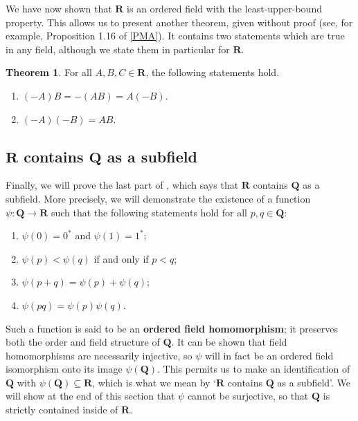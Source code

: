 \documentclass[12pt]{article}
\newcommand{\Q}{\mathbf{Q}}
\newcommand{\R}{\mathbf{R}}
\theoremstyle{definition}
\newtheorem{theorem}{Theorem}
\begin{document}
We have now shown that \( \R \) is an ordered field with the least-upper-bound property. This allows us to present another theorem, given without proof (see, for example, Proposition 1.16 of \hyperlink{pma}{[PMA]}). It contains two statements which are true in any field, although we state them in particular for \( \R \).

\begin{theorem}
\label{thm:multiplication_axioms}
    For all \( A, B, C \in \R \), the following statements hold.
    \begin{enumerate}[label = (\alph*)]
        \item \( (-A)B = -(AB) = A(-B) \).

        \item \( (-A)(-B) = AB \).
    \end{enumerate}
\end{theorem}

\subsection{\texorpdfstring{\(\R\)}{} contains \texorpdfstring{\(\Q\)}{} as a subfield}
\label{sec:R_contains_Q}

Finally, we will prove the last part of , which says that \( \R \) contains \( \Q \) as a subfield. More precisely, we will demonstrate the existence of a function \( \psi : \Q \to \R \) such that the following statements hold for all \( p, q \in \Q \):
\begin{enumerate}[label = (H\arabic*)]
    \item \( \psi(0) = 0^* \) and \( \psi(1) = 1^* \);
    \item \( \psi(p) < \psi(q) \) if and only if \( p < q \);
    \item \( \psi(p + q) = \psi(p) + \psi(q) \);
    \item \( \psi(pq) = \psi(p) \psi(q) \).
\end{enumerate}
Such a function is said to be an \textbf{ordered field homomorphism}; it preserves both the order and field structure of \( \Q \). It can be shown that field homomorphisms are necessarily injective, so \( \psi \) will in fact be an ordered field isomorphism onto its image \( \psi(\Q) \). This permits us to make an identification of \( \Q \) with \( \psi(\Q) \subseteq \R \), which is what we mean by `\( \R \) contains \( \Q \) as a subfield'. We will show at the end of this section that \( \psi \) cannot be surjective, so that \( \Q \) is strictly contained inside of \( \R \).
\end{document}
